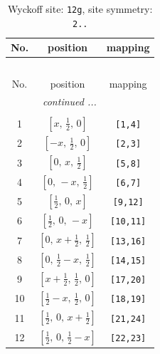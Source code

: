 \documentclass[fleqn,8pt]{jsarticle}
\begin{document}
\begin{longtable}{ccc}
\caption{Wyckoff site: {\tt 12g}, site symmetry: {\tt 2..}}
 \\
 \hline \hline
No. & position & mapping \\ \hline \endfirsthead

\multicolumn{2}{l}{\tablename\ \thetable{}} \\
 \hline \hline
No. & position & mapping \\ \hline \endhead

 \hline \hline
\multicolumn{2}{r}{\footnotesize\it continued ...} \\ \endfoot

 \hline \hline
\multicolumn{2}{r}{} \\ \endlastfoot

1 & $\left[ x,\, \frac{1}{2},\, 0 \right]$ & {\tt [1,4]} \\ \hline
2 & $\left[ - x,\, \frac{1}{2},\, 0 \right]$ & {\tt [2,3]} \\ \hline
3 & $\left[ 0,\, x,\, \frac{1}{2} \right]$ & {\tt [5,8]} \\ \hline
4 & $\left[ 0,\, - x,\, \frac{1}{2} \right]$ & {\tt [6,7]} \\ \hline
5 & $\left[ \frac{1}{2},\, 0,\, x \right]$ & {\tt [9,12]} \\ \hline
6 & $\left[ \frac{1}{2},\, 0,\, - x \right]$ & {\tt [10,11]} \\ \hline
7 & $\left[ 0,\, x + \frac{1}{2},\, \frac{1}{2} \right]$ & {\tt [13,16]} \\ \hline
8 & $\left[ 0,\, \frac{1}{2} - x,\, \frac{1}{2} \right]$ & {\tt [14,15]} \\ \hline
9 & $\left[ x + \frac{1}{2},\, \frac{1}{2},\, 0 \right]$ & {\tt [17,20]} \\ \hline
10 & $\left[ \frac{1}{2} - x,\, \frac{1}{2},\, 0 \right]$ & {\tt [18,19]} \\ \hline
11 & $\left[ \frac{1}{2},\, 0,\, x + \frac{1}{2} \right]$ & {\tt [21,24]} \\ \hline
12 & $\left[ \frac{1}{2},\, 0,\, \frac{1}{2} - x \right]$ & {\tt [22,23]} \\
\end{longtable}
\renewcommand{\arraystretch}{1.2}
\end{document}
